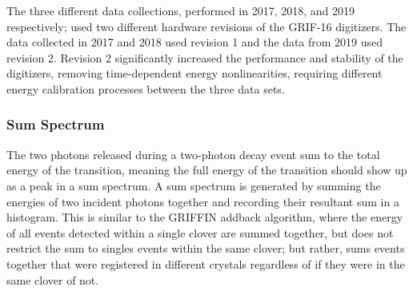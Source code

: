 \documentclass[cnatzke_thesis_proposal.tex]{subfiles}
\begin{document}
The three different data collections, performed in 2017, 2018, and 2019 respectively; used two different hardware revisions of the GRIF-16 digitizers. 
The data collected in 2017 and 2018 used revision 1 and the data from 2019 used revision 2. 
Revision 2 significantly increased the performance and stability of the digitizers, removing time-dependent energy nonlinearities, requiring different energy calibration processes between the three data sets. 

\subsubsection{Sum Spectrum}

The two photons released during a two-photon decay event sum to the total energy of the transition, meaning the full energy of the transition should show up as a peak in a sum spectrum. 
A sum spectrum is generated by summing the energies of two incident photons together and recording their resultant sum in a histogram.
This is similar to the GRIFFIN addback algorithm, where the energy of all events detected within a single clover are summed together, but does not restrict the sum to singles events within the same clover; but rather, sums events together that were registered in different crystals regardless of if they were in the same clover of not. 


\end{document}
